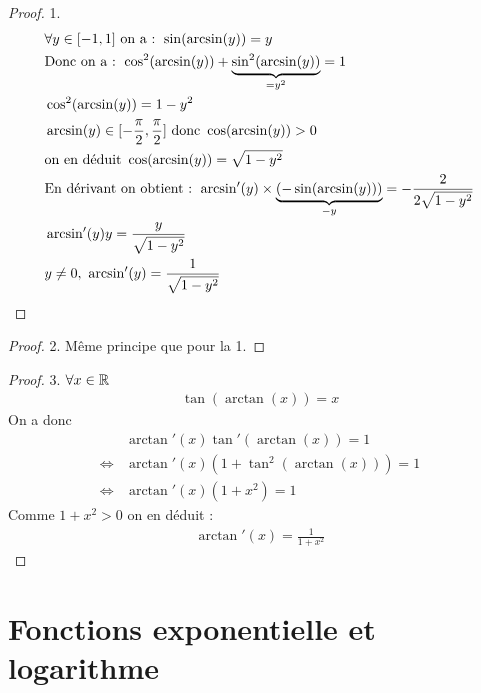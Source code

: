 \begin{proof}
	1.
	\begin{align*}
		&\forall y \in [-1, 1] \textnormal{ on a : } \sin(\arcsin(y)) = y \\
		&\textnormal{Donc on a : } \cos^2(\arcsin(y)) + \underbrace{\sin^2(\arcsin(y))}_{=y^2} = 1 \\
		&\cos^2(\arcsin(y)) = 1 - y^2 \\
		&\arcsin(y) \in [-\frac{\pi}{2}, \frac{\pi}{2}] \textnormal{ donc } \cos(\arcsin(y)) > 0 \\
		&\textnormal{on en déduit } \cos(\arcsin(y)) = \sqrt{1 - y^2} \\
		&\textnormal{En dérivant on obtient : } \arcsin'(y) \times \underbrace{(-\sin(\arcsin(y)))}_{-y} = -\frac{2}{2\sqrt{1-y^2}} \\
		&\arcsin'(y)y = \frac{y}{\sqrt{1-y^2}} \\
		&y \neq 0,\ \arcsin'(y) = \frac{1}{\sqrt{1-y^2}}
	\end{align*}
\end{proof}

\begin{proof}
	2. Même principe que pour la 1.
\end{proof}

\begin{proof}
	3. $\forall x \in \mathbb{R}$
	\begin{align*}
		\tan\left(\arctan(x)\right) = x
	\end{align*}
	On a donc
	\begin{align*}
		&\arctan'(x) \tan'(\arctan(x)) = 1 \\
		\iff&\arctan'(x)(1 + \tan^2(\arctan(x))) = 1\\
		\iff&\arctan'(x) (1 + x^2) = 1 
	\end{align*}
	Comme $1 + x^2 > 0$ on en déduit :
	\begin{align*}
		\arctan'(x) = \frac{1}{1 + x^2}
	\end{align*}
\end{proof}

\section{Fonctions exponentielle et logarithme}

